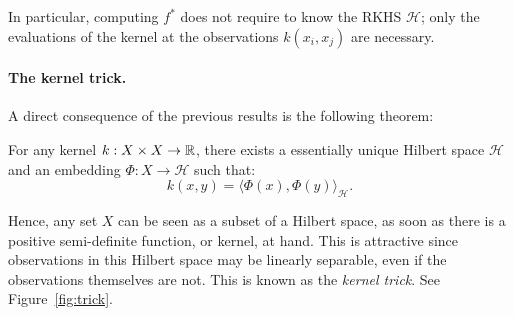 In particular, computing $f^*$ does not require to know the RKHS $\mathcal H$; only the 
evaluations of the kernel at the observations $k(x_i,x_j)$ are necessary. 


\paragraph*{The kernel trick.} %
A direct consequence of the previous results is the following theorem:  %

\begin{cor}
For any kernel $k:X\times X\rightarrow\mathbb{R}$, 
there exists a essentially unique Hilbert space $\mathcal H$ and an embedding $\Phi:X\rightarrow\mathcal H$ such that: 
$$k(x,y)=\langle\Phi(x),\Phi(y)\rangle_{\mathcal H}.$$
\end{cor}


Hence, any set $X$ can be seen as a subset of a Hilbert space, as soon as there is a positive semi-definite function, or kernel, at hand.
This is attractive since observations in this Hilbert space may be linearly separable, even if the observations themselves are not.
This is known as the {\em kernel trick}.
See Figure~\ref{fig:trick}. 

